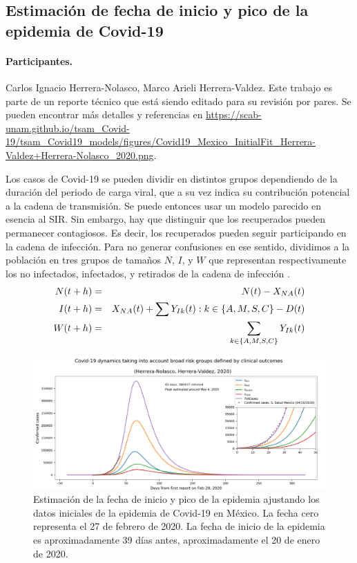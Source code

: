 


\subsection*{Estimación de fecha de inicio y pico de la epidemia de Covid-19}
\paragraph{Participantes.} Carlos Ignacio Herrera-Nolasco, Marco Arieli Herrera-Valdez. Este trabajo es parte de un reporte técnico que está siendo editado para su revisión por pares. Se pueden encontrar más detalles y referencias en \url{https://scab-unam.github.io/tsam_Covid-19/tsam_Covid19_models/figures/Covid19_Mexico_InitialFit_Herrera-Valdez+Herrera-Nolasco_2020.png}.  

Los casos de Covid-19 se pueden dividir en distintos grupos dependiendo de la duración del periodo de carga viral, que a su vez indica su contribución potencial a la cadena de transmisión. Se puede entonces usar un modelo parecido en esencia al SIR. Sin embargo, hay que distinguir que los recuperados pueden permanecer contagiosos. Es decir, los recuperados pueden seguir participando en la cadena de infección. Para no generar confusiones en ese sentido, dividimos a la población en tres grupos de tamaños $N$, $I$, y $W$ que representan respectivamente los no infectados, infectados, y retirados de la cadena de infección \citep{Herrera}. 
\begin{eqnarray}
N(t+h) &=& N(t) - X_{NA}(t)
\\
I(t+h) &=& X_{NA}(t) + \sum{Y_{Ik}(t): k \in \left\{A,M,S,C\right\}}  - D(t)
\\
W(t+h) &=& \sum_{k \in \left\{A,M,S,C\right\}} Y_{Ik}(t) 
\end{eqnarray}

\begin{figure}[h] 
\includegraphics[width=\textwidth]{../tsam_Covid19_models/figures/Covid19_Mexico_InitialFit_Herrera-Valdez+Herrera-Nolasco_2020}
\caption{Estimación de la fecha de inicio y pico de la epidemia ajustando los datos iniciales de la epidemia de Covid-19 en México. La fecha cero representa el 27 de febrero de 2020. La fecha de inicio de la epidemia es aproximadamente 39 días antes, aproximadamente el 20 de enero de 2020.} \label{fig:inicioPicoNIW}
\end{figure}


